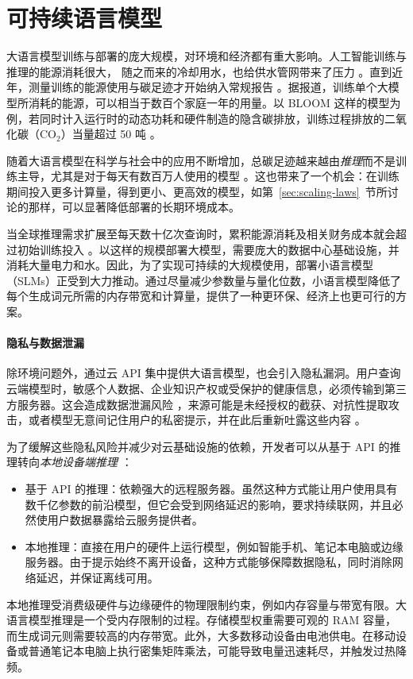 \section{可持续语言模型}
\label{sec:sustainable}
大语言模型训练与部署的庞大规模，对环境和经济都有重大影响。人工智能训练与推理的能源消耗很大，
随之而来的冷却用水，也给供水管网带来了压力 \citep{10.1145/3724499, jegham2025hungryaibenchmarkingenergy}。直到近年，测量训练的能源使用与碳足迹才开始纳入常规报告 \citep{ding2024sustainable}。据报道，训练单个大模型所消耗的能源，可以相当于数百个家庭一年的用量。以 BLOOM 这样的模型为例，若同时计入运行时的动态功耗和硬件制造的隐含碳排放，训练过程排放的二氧化碳（CO$_2$）当量超过 50 吨 \citep{JMLR:v24:23-0069}。

随着大语言模型在科学与社会中的应用不断增加，总碳足迹越来越由\emph{推理}而不是训练主导，尤其是对于每天有数百万人使用的模型 \citep{ozcan2025quantifying, wu2022sustainable, samsi2023words}。这也带来了一个机会：在训练期间投入更多计算量，得到更小、更高效的模型，如第~\ref{sec:scaling-laws}~节所讨论的那样，可以显著降低部署的长期环境成本。

当全球推理需求扩展至每天数十亿次查询时，累积能源消耗及相关财务成本就会超过初始训练投入 \citep{faiz2024llmcarbon}。以这样的规模部署大模型，需要庞大的数据中心基础设施，并消耗大量电力和水。因此，为了实现可持续的大规模使用，部署小语言模型（SLMs）正受到大力推动。通过尽量减少参数量与量化位数，小语言模型降低了每个生成词元所需的内存带宽和计算量，提供了一种更环保、经济上也更可行的方案。

\paragraph{隐私与数据泄漏}
除环境问题外，通过云 API 集中提供大语言模型，也会引入隐私漏洞。用户查询云端模型时，敏感个人数据、企业知识产权或受保护的健康信息，必须传输到第三方服务器。这会造成数据泄漏风险 \citep{aiyappa-etal-2023-trust, li2024opensourcedatacontamination}，来源可能是未经授权的截获、对抗性提取攻击，或者模型无意间记住用户的私密提示，并在此后重新吐露这些内容 \citep{chen2024janus, maini2024llm, liu2022membership}。

为了缓解这些隐私风险并减少对云基础设施的依赖，开发者可以从基于 API 的推理转向\emph{本地设备端推理} \citep{qu2025mobile}：
\begin{itemize}
    \item 基于 API 的推理：依赖强大的远程服务器。虽然这种方式能让用户使用具有数千亿参数的前沿模型，但它会受到网络延迟的影响，要求持续联网，并且必然使用户数据暴露给云服务提供者。
    \item 本地推理：直接在用户的硬件上运行模型，例如智能手机、笔记本电脑或边缘服务器。由于提示始终不离开设备，这种方式能够保障数据隐私，同时消除网络延迟，并保证离线可用。
\end{itemize}
本地推理受消费级硬件与边缘硬件的物理限制约束，例如内存容量与带宽有限。大语言模型推理是一个受内存限制的过程。存储模型权重需要可观的 RAM 容量，而生成词元则需要较高的内存带宽。此外，大多数移动设备由电池供电。在移动设备或普通笔记本电脑上执行密集矩阵乘法，可能导致电量迅速耗尽，并触发过热降频。


